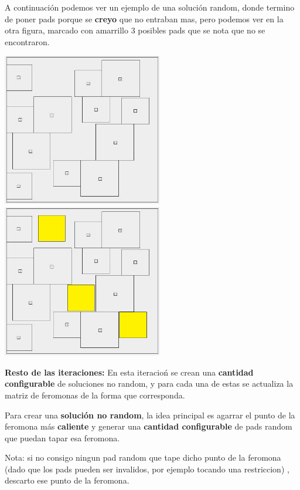 A continuaci\'on podemos ver un ejemplo de una soluci\'on random, donde termino de poner pads porque se \textbf{creyo} que no entraban mas, pero podemos ver en la otra figura, marcado con amarrillo 3 posibles pads que se nota que no se encontraron.

\begin{center}
\includegraphics[width=7cm]{imagenes/ejemplo2}
\includegraphics[width=7cm]{imagenes/ejemplo3}
\end{center}




\textbf{Resto de las iteraciones:} En esta iteracio\'n se crean una \textbf{cantidad configurable} de soluciones no random, y para cada una de estas se actualiza la matriz de feromonas de la forma que corresponda.

Para crear una \textbf{soluci\'on no random}, la idea principal es agarrar el punto de la feromona m\'as \textbf{caliente} y generar una \textbf{cantidad configurable} de pads random que puedan tapar esa feromona. 

Nota: si no consigo ningun pad random que tape dicho punto de la feromona (dado que los pads pueden ser invalidos, por ejemplo tocando una restriccion) , descarto ese punto de la feromona. 


